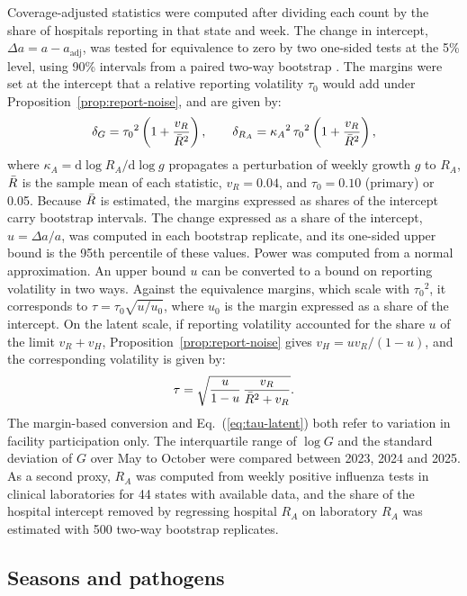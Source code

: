 Coverage-adjusted statistics were computed after dividing each count by the share of hospitals reporting in that state and week. The change in intercept, $\Delta a=a-a_{\mathrm{adj}}$, was tested for equivalence to zero by two one-sided tests at the 5\% level, using 90\% intervals from a paired two-way bootstrap \citep{schuirmann1987comparison}. The margins were set at the intercept that a relative reporting volatility $\tau_0$ would add under Proposition~\ref{prop:report-noise}, and are given by:
\begin{equation}
  \delta_G=\tau_0{}^2\left(1+\frac{v_R}{\bar{R}^2}\right),\qquad
  \delta_{R_A}=\kappa_A{}^2\,\tau_0{}^2\left(1+\frac{v_R}{\bar{R}^2}\right),
  \label{eq:tost}
\end{equation}
where $\kappa_A=\mathrm{d}\log R_A/\mathrm{d}\log g$ propagates a perturbation of weekly growth $g$ to $R_A$, $\bar{R}$ is the sample mean of each statistic, $v_R=0.04$, and $\tau_0=0.10$ (primary) or 0.05. Because $\bar{R}$ is estimated, the margins expressed as shares of the intercept carry bootstrap intervals. The change expressed as a share of the intercept, $u=\Delta a/a$, was computed in each bootstrap replicate, and its one-sided upper bound is the 95th percentile of these values. Power was computed from a normal approximation. An upper bound $u$ can be converted to a bound on reporting volatility in two ways. Against the equivalence margins, which scale with $\tau_0{}^2$, it corresponds to $\tau=\tau_0\sqrt{u/u_0}$, where $u_0$ is the margin expressed as a share of the intercept. On the latent scale, if reporting volatility accounted for the share $u$ of the limit $v_R+v_H$, Proposition~\ref{prop:report-noise} gives $v_H=uv_R/(1-u)$, and the corresponding volatility is given by:
\begin{equation}
  \tau=\sqrt{\frac{u}{1-u}\,\frac{v_R}{\bar{R}^2+v_R}}.
  \label{eq:tau-latent}
\end{equation}
The margin-based conversion and Eq.~(\ref{eq:tau-latent}) both refer to variation in facility participation only. The interquartile range of $\log G$ and the standard deviation of $G$ over May to October were compared between 2023, 2024 and 2025. As a second proxy, $R_A$ was computed from weekly positive influenza tests in clinical laboratories for 44 states with available data, and the share of the hospital intercept removed by regressing hospital $R_A$ on laboratory $R_A$ was estimated with 500 two-way bootstrap replicates.

\subsection{Seasons and pathogens}
\label{sec:meth-seasons}

